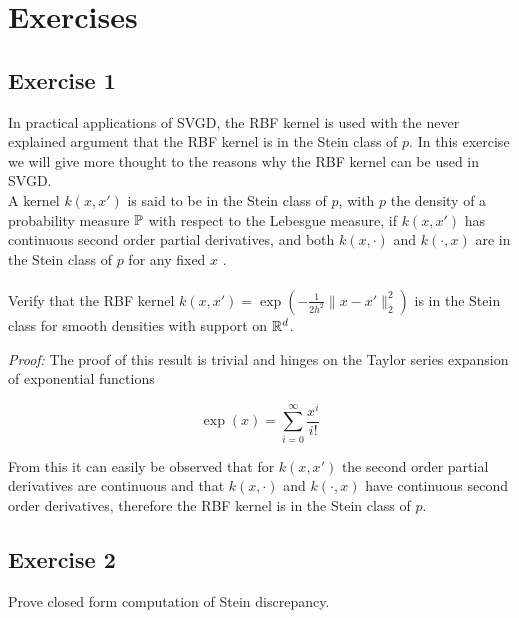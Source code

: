 

\section{Exercises}

\subsection{Exercise 1}
In practical applications of SVGD, the RBF kernel is used with the never explained argument that the RBF kernel is in the Stein class of $p$. In this exercise we will give more thought to the reasons why the RBF kernel can be used in SVGD.
\\
\noindent A kernel $k(x, x')$ is said to be in the Stein class of $p$, with $p$ the density of a probability measure $\mathbb{P}$ with respect to the Lebesgue measure, if $k(x, x')$ has continuous second order partial derivatives, and both $k(x, \cdot)$ and $k(\cdot, x)$ are in the Stein class of $p$ for any fixed $x$ \cite{liu2016kernelized}. 
\\
\\
\noindent Verify that the RBF kernel $k(x, x') = \exp \left(-\frac{1}{2h^2}\parallel x - x'\parallel^2_2 \right)$ is in the Stein class for smooth densities with support on $\mathbb{R}^d$.

\noindent \emph{Proof:} The proof of this result is trivial and hinges on the Taylor series expansion of exponential functions

\begin{equation*}
\exp(x) = \sum_{i=0}^{\infty} \frac{x^i}{i!}
\end{equation*}

From this it can easily be observed that for $k(x, x')$ the second order partial derivatives are continuous and that $k(x, \cdot)$ and $k(\cdot, x)$ have continuous second order derivatives, therefore the RBF kernel is in the Stein class of $p$.

\subsection{Exercise 2}
Prove closed form computation of Stein discrepancy.
